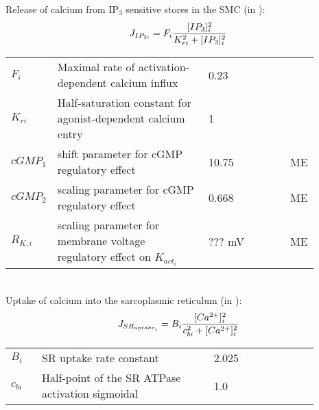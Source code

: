 \documentclass[fleqn]{report}
\numberwithin{equation}{section}
\numberwithin{equation}{section}
\begin{document}
					

	Release of calcium from IP$_{3}$ sensitive stores in the SMC (in \uMps):
	\begin{equation} \label{eq:IP3i}
	J_{IP_{3i}} = F_{i}\frac{[IP_{3}]_{i}^{2}}{K_{ri}^{2}+[IP_{3}]_{i}^{2}}
	\end{equation}
	\begin{table}[h!]
	\centering
	\begin{tabular}{ p{0.09\linewidth}  >{\footnotesize} p{0.5\linewidth}  >{\footnotesize} p{0.27\linewidth} >{\footnotesize} p{0.03\linewidth} }
	\hline
	 $F_{i}$      			& Maximal rate of activation-dependent calcium influx			& 0.23 \uMps				& \cite{Koenigsberger2006} \\
	$K_{ri}$				& Half-saturation constant for agonist-dependent calcium entry	& 1 \uM					& \cite{Koenigsberger2006} \\
	$cGMP_1$				& shift parameter for cGMP regulatory effect	& 10.75  \uM					&   ME \\
	$cGMP_2$				& scaling parameter for cGMP regulatory effect	& 0.668 \uM					&   ME \\
	$R_{K,i}$				& scaling parameter for membrane voltage regulatory effect on $K_{act_{i}}$	& ???   mV					&   ME \\
	\hline
	\end{tabular}
	\label{tab:IP3i}
	\end{table}
	\\
	Uptake of calcium into the sarcoplasmic reticulum (in \uMs):
	\begin{equation} \label{eq:JSRuptakei}
	J_{SR_{uptake_{i}}} = B_{i}\frac{[Ca^{2+}]_{i}^{2}}{c_{bi}^{2}+[Ca^{2+}]_{i}^{2}}
	\end{equation}
	\begin{table}[h!]
	\centering
	\begin{tabular}{ p{0.09\linewidth}  >{\footnotesize} p{0.5\linewidth}  >{\footnotesize} p{0.27\linewidth} >{\footnotesize} p{0.03\linewidth} }
	\hline
	$B_{i}$      			& SR uptake rate constant							& 2.025 \uMs				& \cite{Koenigsberger2006} \\
	$c_{bi}$				& Half-point of the SR ATPase activation sigmoidal 	& 1.0 \uM					& \cite{Koenigsberger2006} \\
	\hline
	\end{tabular}
	\label{tab:JSRuptakei}
	\end{table}
\end{document}
